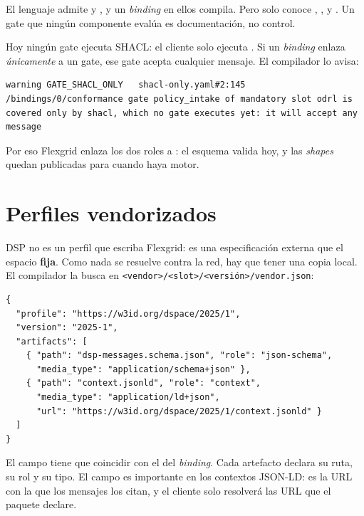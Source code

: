 \begin{trampaHabitual}
El lenguaje admite  y , y un \emph{binding} en ellos compila. Pero
 solo conoce , ,  y
. Un gate que ningún componente evalúa es documentación, no control.
\end{trampaHabitual}

\begin{trampaHabitual}
Hoy ningún gate ejecuta SHACL: el cliente solo ejecuta . Si un \emph{binding} 
enlaza \emph{únicamente}  a un gate, ese gate acepta cualquier mensaje. El compilador lo avisa:

\begin{lstlisting}[style=out]
warning GATE_SHACL_ONLY   shacl-only.yaml#2:145 /bindings/0/conformance gate policy_intake of mandatory slot odrl is covered only by shacl, which no gate executes yet: it will accept any message
\end{lstlisting}

Por eso Flexgrid enlaza los dos roles a : el esquema valida hoy, y las \emph{shapes} quedan
publicadas para cuando haya motor.
\end{trampaHabitual}

\section{Perfiles vendorizados}

DSP no es un perfil que escriba Flexgrid: es una especificación externa que el espacio \textbf{fija}. Como nada se
resuelve contra la red, hay que tener una copia local. El compilador la busca en
\texttt{<vendor>/\allowbreak{}<slot>/\allowbreak{}<versión>/\allowbreak{}vendor.json}:

\begin{lstlisting}[style=json]
{
  "profile": "https://w3id.org/dspace/2025/1",
  "version": "2025-1",
  "artifacts": [
    { "path": "dsp-messages.schema.json", "role": "json-schema",
      "media_type": "application/schema+json" },
    { "path": "context.jsonld", "role": "context",
      "media_type": "application/ld+json",
      "url": "https://w3id.org/dspace/2025/1/context.jsonld" }
  ]
}
\end{lstlisting}

El campo  tiene que coincidir con el del \emph{binding}. Cada artefacto declara su ruta, su rol y
su tipo. El campo  es importante en los contextos JSON-LD: es la URL con la que los mensajes los citan,
y el cliente solo resolverá las URL que el paquete declare.

